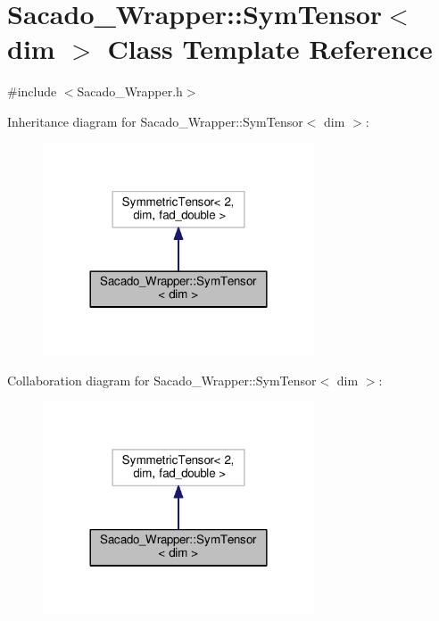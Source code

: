 \hypertarget{classSacado__Wrapper_1_1SymTensor}{}\section{Sacado\+\_\+\+Wrapper\+:\+:Sym\+Tensor$<$ dim $>$ Class Template Reference}
\label{classSacado__Wrapper_1_1SymTensor}


{\ttfamily \#include $<$Sacado\+\_\+\+Wrapper.\+h$>$}



Inheritance diagram for Sacado\+\_\+\+Wrapper\+:\+:Sym\+Tensor$<$ dim $>$\+:
\nopagebreak
\begin{figure}[H]
\begin{center}
\leavevmode
\includegraphics[width=228pt]{classSacado__Wrapper_1_1SymTensor__inherit__graph}
\end{center}
\end{figure}


Collaboration diagram for Sacado\+\_\+\+Wrapper\+:\+:Sym\+Tensor$<$ dim $>$\+:
\nopagebreak
\begin{figure}[H]
\begin{center}
\leavevmode
\includegraphics[width=228pt]{classSacado__Wrapper_1_1SymTensor__coll__graph}
\end{center}
\end{figure}
